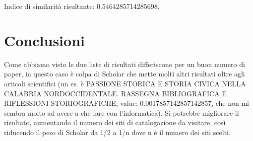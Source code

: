 \documentclass[12pt]{article}
\begin{document}
Indice di similarit\`a risultante: 0.5464285714285698.

\section{Conclusioni}
Come abbiamo visto le due liste di risultati differiscono per un buon numero di paper, in questo caso \`e colpa di Scholar che mette molti altri risultati oltre agli articoli scientifici (un es. \`e PASSIONE STORICA E STORIA CIVICA NELLA CALABRIA NORDOCCIDENTALE. RASSEGNA BIBLIOGRAFICA E RIFLESSIONI STORIOGRAFICHE, value: 0.0017857142857142857, che non mi sembra molto ad avere a che fare con l'informatica). Si potrebbe migliorare il risultato, aumentando il numero dei siti di catalogazione da visitare, cos\`i riducendo il peso di Scholar da 1/2 a 1/n dove n \`e il numero dei siti scelti.
\end{document}
